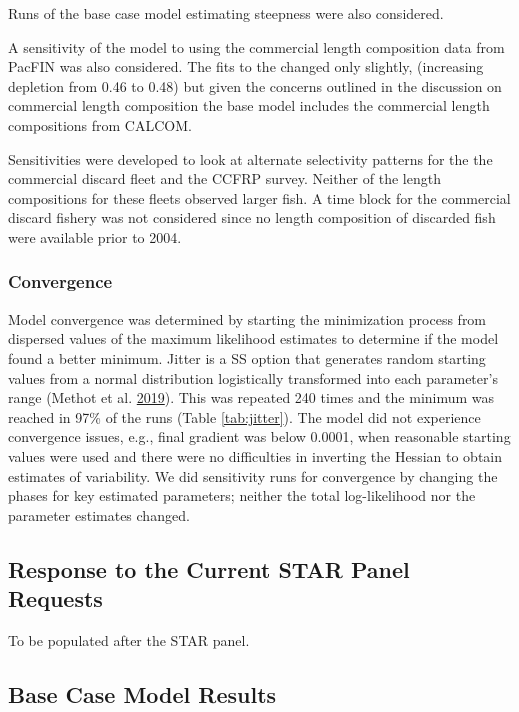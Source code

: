 \documentclass[12pt,]{article}
\begin{document}
Runs of the base case model estimating steepness were also considered.

A sensitivity of the model to using the commercial length composition
data from PacFIN was also considered. The fits to the changed only
slightly, (increasing depletion from 0.46 to 0.48) but given the
concerns outlined in the discussion on commercial length composition the
base model includes the commercial length compositions from CALCOM.

Sensitivities were developed to look at alternate selectivity patterns
for the the commercial discard fleet and the CCFRP survey. Neither of
the length compositions for these fleets observed larger fish. A time
block for the commercial discard fishery was not considered since no
length composition of discarded fish were available prior to 2004.

\subsubsection{Convergence}\label{convergence}

Model convergence was determined by starting the minimization process
from dispersed values of the maximum likelihood estimates to determine
if the model found a better minimum. Jitter is a SS option that
generates random starting values from a normal distribution logistically
transformed into each parameter's range (Methot et al.
\protect\hyperlink{ref-Methot2019}{2019}). This was repeated 240 times
and the minimum was reached in 97\% of the runs (Table
\ref{tab:jitter}). The model did not experience convergence issues,
e.g., final gradient was below 0.0001, when reasonable starting values
were used and there were no difficulties in inverting the Hessian to
obtain estimates of variability. We did sensitivity runs for convergence
by changing the phases for key estimated parameters; neither the total
log-likelihood nor the parameter estimates changed.

\subsection{Response to the Current STAR Panel
Requests}\label{response-to-the-current-star-panel-requests}

To be populated after the STAR panel.

\subsection{Base Case Model Results}\label{base-case-model-results}
\end{document}

